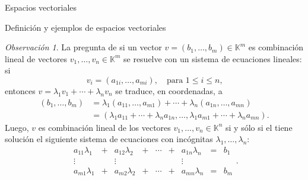 \documentclass[a4paper,12pt,twoside,spanish,reqno]{amsbook}
\theoremstyle{definition}
\theoremstyle{remark}
\newtheorem{observacion}{Observaci\'on}[section]
\newcommand{\K}{\mathbb K}
\begin{document}
\begin{chapter}{Espacios vectoriales}
\begin{section}{Definición y ejemplos de espacios vectoriales}
		\begin{observacion}
			La pregunta de si un vector $v =(b_1,\ldots,b_m) \in \K^m$ es combinación lineal de vectores $v_1,\ldots,v_n \in \K^m$ se resuelve con un sistema de ecuaciones lineales: si 
			$$
			v_i = (a_{1i},\ldots,a_{mi}), \quad \text{para $1 \le i \le n$,}
			$$
			entonces $v = \lambda_1v_1 + \cdots +\lambda_nv_n$ se traduce, en coordenadas, a
			\begin{align*}
				(b_1,\ldots,b_m) &= \lambda_1(a_{11},\ldots,a_{m1}) + \cdots +\lambda_n(a_{1n},\ldots,a_{mn}) \\
				&= (\lambda_1a_{11} + \cdots+ \lambda_na_{1n}, \ldots, \lambda_1a_{m1} + \cdots+ \lambda_na_{mn}).
			\end{align*}
			Luego, $v$  es combinación lineal de los vectores $v_1,\ldots,v_n \in \K^n$ si y sólo si el tiene solución el siguiente sistema de ecuaciones con incógnitas $\lambda_1,\ldots, \lambda_n$: 
			\begin{equation*}
			\begin{matrix}
			a_{11}\lambda_1& + &a_{12}\lambda_2& + &\cdots& + &a_{1n}\lambda_n &= &b_1\\
			\vdots&  &\vdots& &&  &\vdots \\
			a_{m1}\lambda_1& + &a_{m2}\lambda_2& + &\cdots& + &a_{mn}\lambda_n &=&b_m
			\end{matrix}.
			\end{equation*}
		\end{observacion}
		

\end{section}
\end{chapter}
\end{document}
